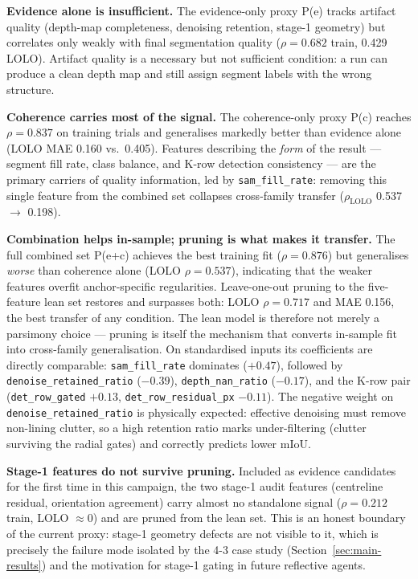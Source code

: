 \textbf{Evidence alone is insufficient.} The evidence-only proxy P(e) tracks
artifact quality (depth-map completeness, denoising retention, stage-1
geometry) but correlates only weakly with final segmentation quality
($\rho = 0.682$ train, 0.429 LOLO). Artifact quality is a necessary but not
sufficient condition: a run can produce a clean depth map and still assign
segment labels with the wrong structure.

\textbf{Coherence carries most of the signal.} The coherence-only proxy P(c)
reaches $\rho = 0.837$ on training trials and generalises markedly better than
evidence alone (LOLO MAE 0.160 vs.\ 0.405). Features describing the
\emph{form} of the result --- segment fill rate, class balance, and K-row
detection consistency --- are the primary carriers of quality information,
led by \texttt{sam\_fill\_rate}: removing this single feature from the
combined set collapses cross-family transfer ($\rho_{\text{LOLO}}$ 0.537
$\rightarrow$ 0.198).

\textbf{Combination helps in-sample; pruning is what makes it transfer.} The
full combined set P(e+c) achieves the best training fit ($\rho = 0.876$) but
generalises \emph{worse} than coherence alone (LOLO $\rho = 0.537$),
indicating that the weaker features overfit anchor-specific regularities.
Leave-one-out pruning to the five-feature lean set restores and surpasses
both: LOLO $\rho = 0.717$ and MAE 0.156, the best transfer of any condition.
The lean model is therefore not merely a parsimony choice --- pruning is
itself the mechanism that converts in-sample fit into cross-family
generalisation. On standardised inputs its coefficients are directly
comparable: \texttt{sam\_fill\_rate} dominates ($+0.47$), followed by
\texttt{denoise\_retained\_ratio} ($-0.39$), \texttt{depth\_nan\_ratio}
($-0.17$), and the K-row pair (\texttt{det\_row\_gated} $+0.13$,
\texttt{det\_row\_residual\_px} $-0.11$). The negative weight on
\texttt{denoise\_retained\_ratio} is physically expected: effective denoising
must remove non-lining clutter, so a high retention ratio marks under-filtering
(clutter surviving the radial gates) and correctly predicts lower mIoU.

\textbf{Stage-1 features do not survive pruning.} Included as evidence
candidates for the first time in this campaign, the two stage-1 audit features
(centreline residual, orientation agreement) carry almost no standalone signal
($\rho = 0.212$ train, LOLO $\approx 0$) and are pruned from the lean set.
This is an honest boundary of the current proxy: stage-1 geometry defects are
not visible to it, which is precisely the failure mode isolated by the 4-3
case study (Section~\ref{sec:main-results}) and the motivation for stage-1
gating in future reflective agents.

